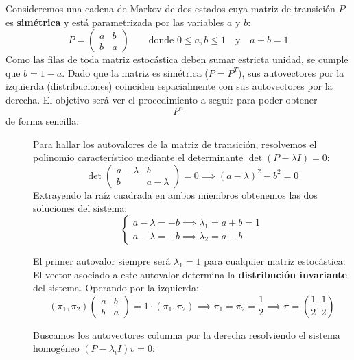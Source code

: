 \begin{ejemplo}
    Consideremos una cadena de Markov de dos estados cuya matriz de transición $P$ es \textbf{simétrica} y está parametrizada por las variables $a$ y $b$:
    \[ 
    P = \begin{pmatrix} a & b \\ b & a \end{pmatrix} \qquad \text{donde } 0 \le a, b \le 1 \quad \text{y} \quad a+b = 1
    \]
    Como las filas de toda matriz estocástica deben sumar estricta unidad, se cumple que $b = 1-a$. Dado que la matriz es simétrica ($P = P^T$), sus autovectores por la izquierda (distribuciones) coinciden espacialmente con sus autovectores por la derecha. El objetivo será ver el procedimiento a seguir para poder obtener 
    \begin{equation*}
        P^n
    \end{equation*}
    de forma sencilla.
    \begin{description}
        \item[] Para hallar los autovalores de la matriz de transición, resolvemos el polinomio característico mediante el determinante $\det(P - \lambda I) = 0$:
        \[ 
        \det \begin{pmatrix} a-\lambda & b \\ b & a-\lambda \end{pmatrix} = 0 \implies (a-\lambda)^2 - b^2 = 0 
        \]
        Extrayendo la raíz cuadrada en ambos miembros obtenemos las dos soluciones del sistema:
        \begin{equation*}
            \begin{cases} 
                a-\lambda = -b \implies \lambda_1 = a+b = 1 \\ 
                a-\lambda = +b \implies \lambda_2 = a-b 
            \end{cases}
        \end{equation*}

        \begin{observacion}
            El primer autovalor siempre será $\lambda_1 = 1$ para cualquier matriz estocástica. El vector asociado a este autovalor determina la \textbf{distribución invariante} del sistema. Operando por la izquierda:
            \[ 
            (\pi_1, \pi_2) \begin{pmatrix} a & b \\ b & a \end{pmatrix} = 1 \cdot (\pi_1, \pi_2) \implies \pi_1 = \pi_2 = \frac{1}{2} \implies \pi = \left(\frac{1}{2}, \frac{1}{2}\right) 
            \]
        \end{observacion}
        \item[] Buscamos los autovectores columna por la derecha resolviendo el sistema homogéneo $(P - \lambda_i I)v = 0$:


\end{description}
\end{ejemplo}
